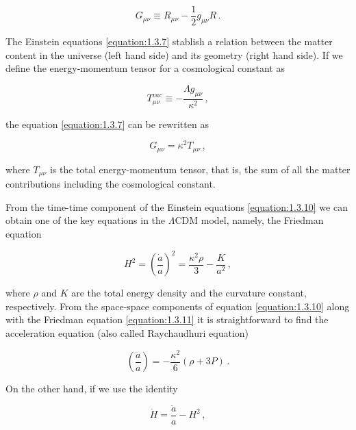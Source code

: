 \begin{equation}
G_{\mu\nu} \equiv R_{\mu\nu} - \frac{1}{2}g_{\mu\nu}R \, .
\label{equation:1.3.8}
\end{equation}

The Einstein equations \eqref{equation:1.3.7} stablish a relation between the matter content in the universe (left hand side) and its geometry (right hand side). If we define the energy-momentum tensor for a cosmological constant as

\begin{equation}
T_{\mu\nu}^{vac} \equiv -\frac{\Lambda g_{\mu\nu}}{\kappa^2} \, ,
\label{equation:1.3.9}
\end{equation}

the equation \eqref{equation:1.3.7} can be rewritten as

\begin{equation}
G_{\mu\nu} = \kappa^2 T_{\mu\nu} \, ,
\label{equation:1.3.10}
\end{equation}

where $ T_{\mu\nu} $ is the total energy-momentum tensor, that is, the sum of all the matter contributions including the cosmological constant.

From the time-time component of the Einstein equations \eqref{equation:1.3.10} we can obtain one of the key equations in the $ \Lambda $CDM model, namely, the Friedman equation 

\begin{equation}
H^2=\left(\frac{\dot{a}}{a}\right)^2=\frac{\kappa^2 \rho}{3}-\frac{K}{a^2}\, ,
\label{equation:1.3.11}
\end{equation}

where $ \rho $ and $ K $ are the total energy density and the curvature constant, respectively. From the space-space components of equation \eqref{equation:1.3.10} along with the Friedman equation \eqref{equation:1.3.11} it is straightforward to find the acceleration equation (also called Raychaudhuri equation) 

\begin{equation}
\left(\frac{\ddot{a}}{a}\right)=-\frac{\kappa^2 }{6}\left(\rho+3P\right) \, .
\label{equation:1.3.12}
\end{equation}

On the other hand, if we use the identity 

\begin{equation}
\dot{H}=\frac{\ddot{a}}{a}-H^2 \, ,
\label{equation:1.3.13}
\end{equation}


